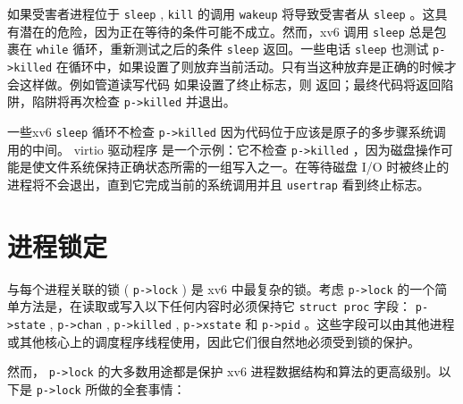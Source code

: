 如果受害者进程位于
    \lstinline{sleep}    ,
    \lstinline{kill}    的调用
    \lstinline{wakeup}    将导致受害者从
    \lstinline{sleep}    。这具有潜在的危险，因为正在等待的条件可能不成立。然而，xv6 调用
    \lstinline{sleep}    总是包裹在
    \lstinline{while}    循环，重新测试之后的条件
    \lstinline{sleep}    返回。一些电话
    \lstinline{sleep}    也测试
    \lstinline{p->killed}    在循环中，如果设置了则放弃当前活动。只有当这种放弃是正确的时候才会这样做。例如管道读写代码
如果设置了终止标志，则        返回；最终代码将返回陷阱，陷阱将再次检查    \lstinline{p->killed}    并退出。  

一些xv6
    \lstinline{sleep}    循环不检查
    \lstinline{p->killed}    因为代码位于应该是原子的多步骤系统调用的中间。 virtio 驱动程序
        是一个示例：它不检查
    \lstinline{p->killed}   ，因为磁盘操作可能是使文件系统保持正确状态所需的一组写入之一。在等待磁盘 I/O 时被终止的进程将不会退出，直到它完成当前的系统调用并且
    \lstinline{usertrap}    看到终止标志。  

   \section{进程锁定  }     

与每个进程关联的锁 (    \lstinline{p->lock}    ) 是 xv6 中最复杂的锁。考虑    \lstinline{p->lock}    的一个简单方法是，在读取或写入以下任何内容时必须保持它
    \lstinline{struct proc}    字段：
    \lstinline{p->state}    ,
    \lstinline{p->chan}    ,
    \lstinline{p->killed}    ,
    \lstinline{p->xstate}    和
    \lstinline{p->pid}   。这些字段可以由其他进程或其他核心上的调度程序线程使用，因此它们很自然地必须受到锁的保护。  

然而，   \lstinline{p->lock}    的大多数用途都是保护 xv6 进程数据结构和算法的更高级别。以下是    \lstinline{p->lock}    所做的全套事情：  

